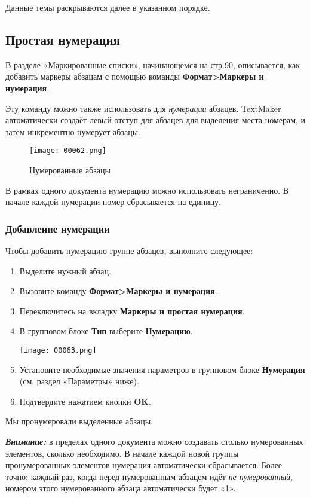 \documentclass[a4paper,10pt]{article}
\begin{document}
Данные темы раскрываются далее в указанном порядке.

\subsection{Простая нумерация}
В разделе «Маркированные списки», начинающемся на стр.90, описывается, как добавить маркеры абзацам с помощью команды \textbf{Формат>Маркеры и нумерация}.

Эту команду можно также использовать для \textit{нумерации} абзацев. TextMaker автоматически создаёт левый отступ для абзацев для выделения места номерам, и затем инкрементно нумерует абзацы.

\begin{figure}[ht]
\texttt{[image: 00062.png]}
\centering
\caption{Нумерованные абзацы}
\end{figure}

В рамках одного документа нумерацию можно использовать неграниченно. В начале каждой нумерации номер сбрасывается на единицу.

\subsubsection{Добавление нумерации}
Чтобы добавить нумерацию группе абзацев, выполните следующее:

\begin{enumerate}
 \item Выделите нужный абзац.
 \item Вызовите команду \textbf{Формат>Маркеры и нумерация}.
 \item Переключитесь на вкладку \textbf{Маркеры и простая нумерация}.
 \item В групповом блоке \textbf{Тип} выберите \textbf{Нумерацию}.
 
 \texttt{[image: 00063.png]}
 
 \item Установите необходимые значения параметров в групповом блоке \textbf{Нумерация} (см. раздел «Параметры» ниже).
 \item Подтвердите нажатием кнопки \textbf{OK}. 
\end{enumerate}

Мы пронумеровали выделенные абзацы.

\textit{\textbf{Внимание:}} в пределах одного документа можно создавать столько нумерованных элементов, сколько необходимо. В начале каждой новой группы пронумерованных элементов нумерация автоматически сбрасывается. Более точно: каждый раз, когда перед нумерованным абзацем идёт \textit{не нумерованный}, номером этого нумерованного абзаца автоматически будет «1».
\end{document}
